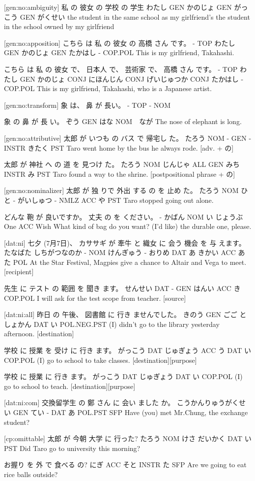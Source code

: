 [gen:no:ambiguity]
私    の   彼女    の  学校     の  学生
わたし GEN かのじょ GEN がっこう GEN がくせい
the student in the same school as my girlfriend's
the student in the school owned by my girlfriend

[gen:no:apposition]
こちら は 私     の  彼女    の  高橋   さん です。
-    TOP わたし GEN かのじょ GEN たかはし - COP.POL
This is my girlfriend, Takahashi.

こちら は  私    の  彼女    で、  日本人    で、  芸術家      で、  高橋   さん です。
-    TOP わたし GEN かのじょ CONJ にほんじん CONJ げいじゅつか CONJ たかはし - COP.POL
This is my girlfriend, Takahashi, who is a Japanese artist.

[gen:no:transform]
象 は、 鼻 が  長い。
-  TOP - NOM

象   の   鼻  が   長 い。
ぞう GEN はな NOM　なが
The nose of elephant is long.

[gen:no:attributive]
太郎   が いつも の  バス で    帰宅し た。
たろう NOM -   GEN  - INSTR きたく PST
Taro went home by the bus he always rode. [adv. + の]

太郎   が  神社    へ   の  道   を    見つけ た。
たろう NOM じんじゃ ALL GEN みち INSTR み    PST
Taro found a way to the shrine. [postpositional phrase + の]

[gen:no:nominalizer]
太郎   が  独 りで 外出 する   の    を  止め た。
たろう NOM ひと - がいしゅつ - NMLZ ACC や PST
Taro stopped going out alone.

どんな 鞄   が   良いですか。 丈夫    の  を ください。
-    かばん NOM い         じょうぶ One ACC Wish
What kind of bag do you want? (I'd like) the durable one, please.

[dat:ni]
七夕     (7月7日)、 カササギ が   牽牛    と 織女  に  会う 機会  を   与 えます。
たなばた しちがつなのか -    NOM けんぎゅう - おりめ DAT あ  きかい ACC あた POL
At the Star Festival, Magpies give a chance to Altair and Vega to meet. [recipient]

先生    に テスト の 範囲    を  聞き ます。
せんせい DAT -   GEN はんい ACC き COP.POL
I will ask for the test scope from teacher. [source]

[dat:ni:all]
昨日   の  午後、 図書館    に   行き ませんでした。
きのう GEN ごご   としょかん DAT い  POL.NEG.PST
(I) didn't go to the library yesterday afternoon. [destination]

学校    に   授業     を   受け に 行き ます。
がっこう DAT じゅぎょう ACC う  DAT い COP.POL
(I) go to school to take classes. [destination][purpose]

学校    に   授業      に  行き ます。
がっこう DAT じゅぎょう DAT い  COP.POL
(I) go to school to teach. [destination][purpose]

[dat:ni:com]
交換留学生           の  鄭 さん に 会い ました    か。
こうかんりゅうがくせい GEN てい - DAT あ  POL.PST SFP
Have (you) met Mr.Chung, the exchange student?

[cp:omittable]
太郎   が  今朝 大学    に   行った?
たろう NOM けさ だいかく DAT い PST
Did Taro go to university this morning?

お握り を   外  で      食べる の?
にぎ   ACC そと INSTR  た SFP
Are we going to eat rice balls outside?
